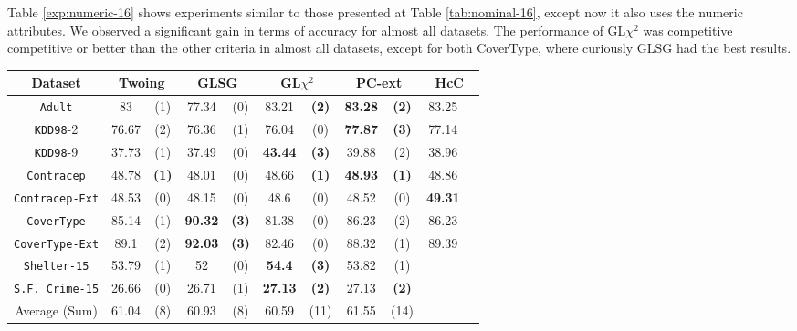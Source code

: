 Table \ref{exp:numeric-16} shows experiments  similar to those presented at Table \ref{tab:nominal-16}, except now it also uses the numeric attributes. We observed a significant gain in terms of accuracy for almost all datasets. 
The performance of GL$\chi^2$ was competitive competitive or better than the other criteria in almost all datasets, except for both CoverType, where curiously GLSG had the best results.

\begin{table}
\small
\centering
\begin{tabular}{c|cc|cc|cc|cc|cc} 
Dataset              &        \multicolumn{2}{c|}{Twoing} &   \multicolumn{2}{c|}{GLSG} &   \multicolumn{2}{c|}{GL$\chi^2$} & \multicolumn{2}{c|}{PC-ext}  & \multicolumn{2}{c}{HcC}  \\  \hline   
{\tt Adult}          &  83            &  (1)              &  77.34      &  (0)          &  83.21       &  {\bf (2)}         & {\bf 83.28} & {\bf (2)}     & 83.25 &  \\
{\tt KDD98}-2        &  76.67         &  (2)              &  76.36      &  (1)          &  76.04       &  (0)               & {\bf 77.87} & {\bf (3)}     & 77.14 &  \\
{\tt KDD98}-9        &  37.73         &  (1)              &  37.49      &  (0)          &  {\bf 43.44} &  {\bf (3)}         &  39.88      & (2)           & 38.96  &   \\
{\tt Contracep}      &  48.78         &  {\bf (1)}        &  48.01      &  (0)          &  48.66       &  {\bf (1)}         & {\bf 48.93} & {\bf (1)}     & 48.86  &   \\
{\tt Contracep-Ext}  &  48.53         &  (0)              &  48.15      &  (0)          &  48.6        &  (0)               &  48.52      & (0)           & {\bf 49.31 } &    \\
{\tt CoverType}      &  85.14         &  (1)              &  {\bf 90.32}&  {\bf (3)}    &  81.38       &  (0)               &  86.23      & (2)           & 86.23 &   \\
{\tt CoverType-Ext}  &  89.1          &  (2)              &  {\bf 92.03}&  {\bf (3)}    &  82.46       &  (0)               &  88.32      & (1)           & 89.39 &    \\
{\tt Shelter-15}     &  53.79         &  (1)              &  52         &  (0)          &  {\bf 54.4}  &  {\bf (3)}         &  53.82      & (1)           &       &   \\   
{\tt S.F. Crime-15}  &  26.66         &  (0)              &  26.71      &  (1)          &  {\bf 27.13} &  {\bf (2)}         &  27.13      & {\bf (2)}     &       &   \\
\hline
Average (Sum)        &   61.04        &  (8)              & 60.93       &  (8)          &   60.59      &  (11)              &  61.55      & (14)          &       & 


\end{tabular}
\end{table}
